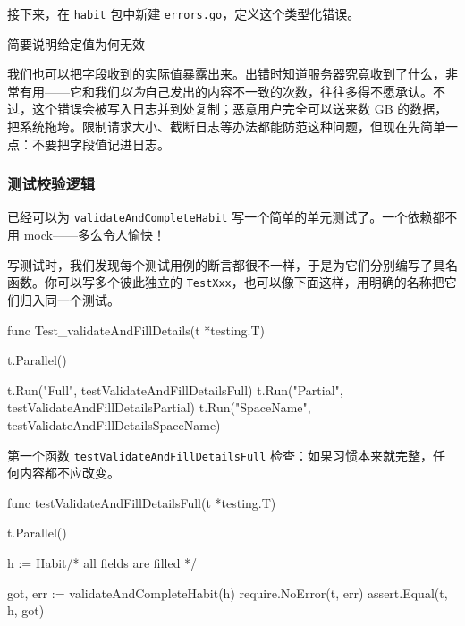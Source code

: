 接下来，在 \texttt{habit} 包中新建 \texttt{errors.go}，定义这个类型化错误。


\begin{codeannotations}
\item 简要说明给定值为何无效
\end{codeannotations}

我们也可以把字段收到的实际值暴露出来。出错时知道服务器究竟收到了什么，非常有用——它和我们\emph{以为}自己发出的内容不一致的次数，往往多得不愿承认。不过，这个错误会被写入日志并到处复制；恶意用户完全可以送来数 GB 的数据，把系统拖垮。限制请求大小、截断日志等办法都能防范这种问题，但现在先简单一点：不要把字段值记进日志。

\subsubsection{测试校验逻辑}

已经可以为 \texttt{validateAndCompleteHabit} 写一个简单的单元测试了。一个依赖都不用 mock——多么令人愉快！

写测试时，我们发现每个测试用例的断言都很不一样，于是为它们分别编写了具名函数。你可以写多个彼此独立的 \texttt{TestXxx}，也可以像下面这样，用明确的名称把它们归入同一个测试。

\begin{gocode}[title={代码清单 10.15 \texttt{create\_internal\_test.go}：测试 \texttt{validateAndCompleteHabit}}]
func Test_validateAndFillDetails(t *testing.T) {
    t.Parallel()

    t.Run("Full", testValidateAndFillDetailsFull)
    t.Run("Partial", testValidateAndFillDetailsPartial)
    t.Run("SpaceName", testValidateAndFillDetailsSpaceName)
}
\end{gocode}

第一个函数 \texttt{testValidateAndFillDetailsFull} 检查：如果习惯本来就完整，任何内容都不应改变。

\begin{gocode}[]
func testValidateAndFillDetailsFull(t *testing.T) {
    t.Parallel()

    h := Habit{/* all fields are filled */}

    got, err := validateAndCompleteHabit(h)
    require.NoError(t, err)
    assert.Equal(t, h, got)
}
\end{gocode}

